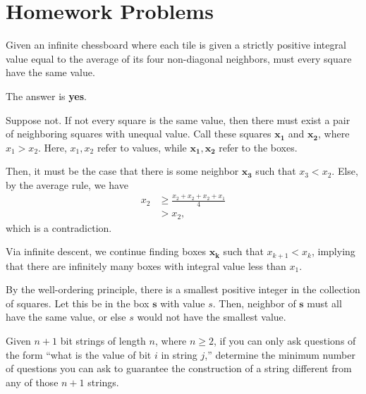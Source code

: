 \documentclass[10pt]{mypackage}
\begin{document}
\RaggedRight
\section{Homework Problems}%
\begin{problem}
  Given an infinite chessboard where each tile is given a strictly positive integral value equal to the average of its four non-diagonal neighbors, must every square have the same value.
\end{problem}
\begin{solution}
  The answer is \textbf{yes}.\newline

  Suppose not. If not every square is the same value, then there must exist a pair of neighboring squares with unequal value. Call these squares $\mathbf{x_1}$ and $\mathbf{x_2}$, where $x_1 > x_2$. Here, $x_1,x_2$ refer to values, while $\mathbf{x_1},\mathbf{x_2}$ refer to the boxes.\newline

  Then, it must be the case that there is some neighbor $\mathbf{x_3}$ such that $x_3 < x_2$. Else, by the average rule, we have
  \begin{align*}
    x_2 &\geq \frac{x_2 + x_2 + x_2 + x_1}{4}\\
        &> x_2,
  \end{align*}
  which is a contradiction.\newline

  Via infinite descent, we continue finding boxes $\mathbf{x_{k}}$ such that $x_{k+1} < x_k$, implying that there are infinitely many boxes with integral value less than $x_1$.
\end{solution}
\begin{solution}
  By the well-ordering principle, there is a smallest positive integer in the collection of squares. Let this be in the box $\mathbf{s}$ with value $s$. Then, neighbor of $\mathbf{s}$ must all have the same value, or else $s$ would not have the smallest value.
\end{solution}
\begin{problem}
Given $n+1$ bit strings of length $n$, where $n\geq 2$, if you can only ask questions of the form ``what is the value of bit $i$ in string $j$,'' determine the minimum number of questions you can ask to guarantee the construction of a string different from any of those $n+1$ strings.
\end{problem}
\end{document}

